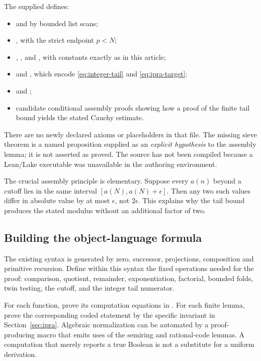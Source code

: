 The supplied  defines:
\begin{itemize}
\item {} and  by bounded list scans;
\item {}, with the strict endpoint \(p<N\);
\item {}, , and ,
with constants exactly as in this article;
\item {} and ,
which encode \eqref{eq:integer-tail} and \eqref{eq:ipra-target};
\item {} and ;
\item candidate conditional assembly proofs showing how a proof of the
finite tail bound yields the stated Cauchy estimate.
\end{itemize}
There are no newly declared axioms or  placeholders in that
file. The missing sieve theorem is a named proposition supplied as an
\emph{explicit hypothesis} to the assembly lemma; it is not asserted as
proved. The source has not been compiled because a Lean/Lake executable
was unavailable in the authoring environment.

The crucial assembly principle is elementary. Suppose every \(a(n)\)
beyond a cutoff lies in the same interval
\([a(N),a(N)+\epsilon]\). Then any two such values differ in absolute value
by at most \(\epsilon\), not \(2\epsilon\). This explains why the tail
bound produces the stated modulus without an additional factor of two.

\subsection{Building the object-language formula}

The existing  syntax is generated by zero, successor,
projections, composition and primitive recursion. Define within this syntax
the fixed operations needed for the proof: comparison, quotient,
remainder, exponentiation, factorial, bounded folds, twin testing,
the cutoff, and the integer tail numerator.

For each function, prove its computation equations in .
For each finite lemma, prove the corresponding coded statement by the
specific invariant in Section~\ref{sec:ipra}. Algebraic normalization can
be automated by a proof-producing macro that emits uses of the semiring
and rational-code lemmas. A computation that merely reports a true
Boolean is not a substitute for a uniform derivation.

